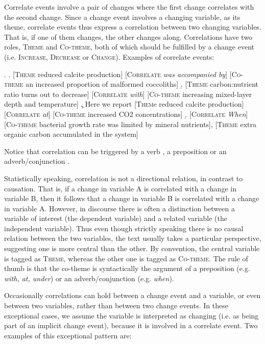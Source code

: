 \documentclass[10pt, a4paper]{article}
\newcommand{\tag}[1]{\textsc{#1}}
\begin{document}
Correlate events involve a pair of changes where the first change correlates with the second change. 
Since a change event involves a changing variable, as its theme, correlate events thus express a correlation between two changing variables. 
That is, if one of them changes, the other changes along. 
Correlations  have two roles, \tag{Theme} and \tag{Co-theme}, both of which should be fulfilled by a change event (i.e. \tag{Increase}, \tag{Decrease} or \tag{Change}).
Examples of correlate events:

\exi.
  \a. [\tag{Theme} reduced calcite production] [\tag{Correlate} \emph{was accompanied by}] [\tag{Co-theme} an increased proportion of malformed coccoliths]
  \b. [\tag{Theme} carbon:nutrient ratio turns out to decrease] [\tag{Correlate}  \emph{with}] [\tag{Co-theme} increasing mixed-layer depth and temperature]
  \c. Here we report [\tag{Them}e reduced calcite production] [\tag{Correlate}  \emph{at}] [\tag{Co-theme} increased CO2 concentrations]
  \d. [\tag{Correlate} \emph{When}] [\tag{Co-theme} bacterial growth rate was limited by mineral nutrients], [\tag{Theme} extra organic carbon accumulated in the system]

Notice that correlation can be triggered by a verb \Last[a], a preposition \Last[b-c] or an adverb/conjunction \Last[d].

Statistically speaking, correlation is not a directional relation, in contrast to causation. That is, if a change in variable A is correlated with a change in variable B, then it follows that a change in variable B is correlated with a change in variable A. However, in discourse there is often a distinction between a variable of interest (the dependent variable) and a related variable (the independent variable). 
Thus even though strictly speaking there is no causal relation between the two variables, the text usually takes a particular perspective, suggesting one is more central than the other. 
By convention, the central variable is tagged as \tag{Theme}, whereas the other one is tagged as \tag{Co-theme}. 
The rule of thumb is that the co-theme is syntactically the argument of a preposition (e.g. \emph{with, at, under}) or an adverb/conjunction (e.g. \emph{when}).  

Occasionally correlations can hold between a change event and a variable, or even between two variables, rather than between two change events.
In these exceptional cases, we assume the variable is interpreted as changing (i.e. as being part of an implicit change event), because it is involved in a correlate event.
Two examples of this exceptional pattern are: 
\end{document}
